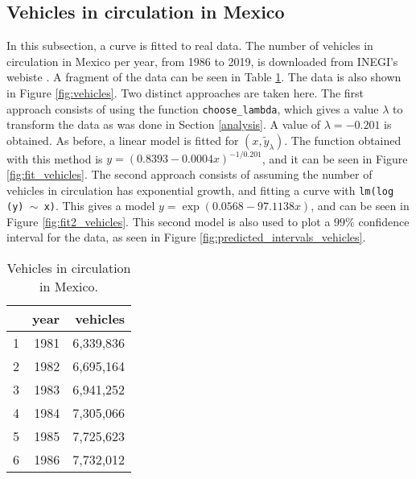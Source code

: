 \documentclass[letterpaper, 10 pt, conference]{article}
\begin{document}
\subsection{Vehicles in circulation in Mexico}
In this subsection, a curve is fitted to real data. The number of vehicles in circulation in Mexico per year, from 1986 to 2019, is downloaded from INEGI's webiste \cite{inegi}. A fragment of the data can be seen in Table \ref{tab:vehicles}. The data is also shown in Figure \ref{fig:vehicles}.
Two distinct approaches are taken here. The first approach consists of using the function \texttt{choose\_lambda}, which gives a value $\lambda$ to transform the data as was done in Section \ref{analysis}. A value of $\lambda = -0.201$ is obtained. As before, a linear model is fitted for $(x, \tilde{y}_\lambda)$. The function obtained with this method is $y = (0.8393 - 0.0004 x)^{-1/0.201}$, and it can be seen in Figure \ref{fig:fit_vehicles}.  The second approach consists of assuming the number of vehicles in circulation has exponential growth, and fitting a curve with \texttt{lm(log (y) $\sim$ x)}. This gives a model $y = \exp(0.0568 - 97.1138x)$, and can be seen in Figure \ref{fig:fit2_vehicles}. This second model is also used to plot a $99\%$ confidence interval for the data, as seen in Figure \ref{fig:predicted_intervals_vehicles}.
\begin{table}
	\centering
	\caption{Vehicles in circulation in Mexico.}
	\begin{tabular}{rrr}
		\hline
		& year & vehicles \\ 
		\hline
		1 & 1981 & 6,339,836 \\ 
		2 & 1982 & 6,695,164 \\ 
		3 & 1983 & 6,941,252 \\ 
		4 & 1984 & 7,305,066 \\ 
		5 & 1985 & 7,725,623 \\ 
		6 & 1986 & 7,732,012 \\ 
		\hline
	\end{tabular}
	\label{tab:vehicles}
\end{table}
\end{document}
